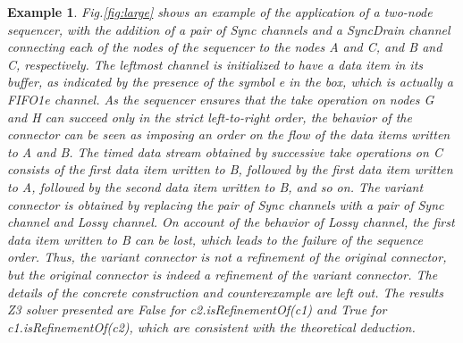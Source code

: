 \documentclass[3p,times]{elsarticle}
\newtheorem{example}{Example}[section]
\begin{document}
\begin{example}
Fig.\ref{fig:large} shows an example of the application of a two-node sequencer, with the addition of a pair of \emph{Sync} channels and a \emph{SyncDrain} channel connecting each of the nodes of the sequencer to the nodes
\emph{A} and \emph{C}, and \emph{B} and \emph{C}, respectively. The leftmost channel is initialized to have a data item in its buffer, as indicated
by the presence of the symbol \emph{e} in the box, which is actually a \emph{FIFO1e} channel. As the sequencer ensures that the take operation on nodes \emph{G} and \emph{H} can succeed only in the strict left-to-right order, the behavior of the connector can be seen as imposing an order on the flow of the data items written to \emph{A} and \emph{B}. The timed data stream obtained by successive take operations on \emph{C} consists of the first data item written to \emph{B}, followed by the first data item written to \emph{A}, followed by the second data item written to \emph{B}, and so on. The variant connector is obtained by replacing the pair of \emph{Sync} channels with a pair of \emph{Sync} channel and \emph{Lossy} channel. On account of the behavior of \emph{Lossy} channel, the first data item written to \emph{B} can be lost, which leads to the failure of the sequence order. Thus, the variant connector is not a refinement of the original connector, but the original connector is indeed a refinement of the variant connector. The details of the concrete construction and counterexample are left out. The results Z3 solver presented are \emph{False} for \emph{c2.isRefinementOf(c1)} and \emph{True} for \emph{c1.isRefinementOf(c2)}, which are consistent with the theoretical deduction.
\begin{figure}
\centering
{}
\end{figure}
\end{example}
\end{document}
